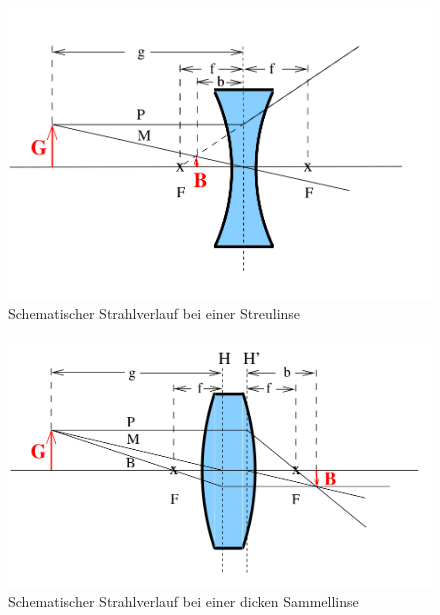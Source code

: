 \begin{figure}
  \includegraphics[width=\linewidth]{Bilder/streulinse.png}
  \caption{Schematischer Strahlverlauf bei einer Streulinse \cite{Anleitung}}
  \label{fig:streuli}
\end{figure}
\blindtext
\begin{figure}
  \includegraphics[width=\linewidth]{Bilder/fettelinse.png}
  \caption{Schematischer Strahlverlauf bei einer dicken Sammellinse \cite{Anleitung}}
  \label{fig:diefette}
\end{figure}
